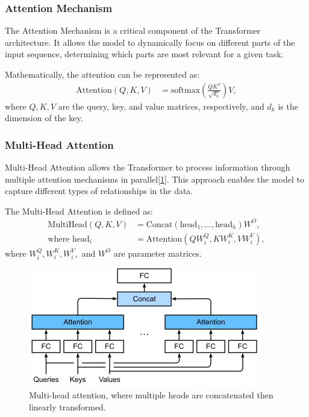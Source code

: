 \documentclass[10pt,twocolumn,letterpaper]{article}
\begin{document}
\subsubsection{Attention Mechanism}
\label{sec:attention}
The Attention Mechanism\cite{vaswani2017attention} is a critical component of the Transformer architecture. It allows the model to dynamically focus on different parts of the input sequence, determining which parts are most relevant for a given task.

Mathematically, the attention can be represented as:
\begin{align*}
    \text{Attention}(Q, K, V) &= \text{softmax}\left(\frac{QK^T}{\sqrt{d_k}}\right)V,
\end{align*}
where \( Q, K, V \) are the query, key, and value matrices, respectively, and \( d_k \) is the dimension of the key.
\subsubsection{Multi-Head Attention}
\label{sec:multi-head}
Multi-Head Attention\cite{vaswani2017attention} allows the Transformer to process information through multiple attention mechanisms in parallel[\ref{fig:mha}]. This approach enables the model to capture different types of relationships in the data.

The Multi-Head Attention is defined as:
\begin{align*}
    \text{MultiHead}(Q, K, V) &= \text{Concat}(\text{head}_1, \ldots, \text{head}_h)W^O, \\
    \text{where head}_i &= \text{Attention}(QW^Q_i, KW^K_i, VW^V_i),
\end{align*}
where \( W^Q_i, W^K_i, W^V_i, \) and \( W^O \) are parameter matrices.
\begin{figure}[h]
	\centering
	\includegraphics[width=\columnwidth]{mha}
	\caption{Multi-head attention, where multiple heads are concatenated then linearly transformed\cite{zhang2023dive}.}
	\label{fig:mha}
\end{figure}
\end{document}
